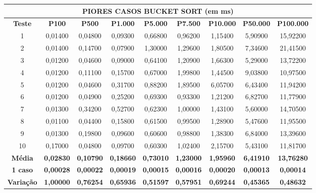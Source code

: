 \documentclass[a4paper, 12pt]{article}
\begin{document}
\begin{tabular}{ccccccccc}

                                                      \multicolumn{ 9}{c}{{\bf PIORES CASOS  BUCKET SORT (em ms)}} \\
\hline
{\bf Teste} & {\bf P100} & {\bf P500} & {\bf P1.000} & {\bf P5.000} & {\bf P7.500} & {\bf P10.000} & {\bf P50.000} & {\bf P100.000} \\
\hline
         1 &    0,01400 &    0,04800 &    0,09300 &    0,66800 &    0,96200 &    1,15400 &    5,90900 &   15,92200 \\
\hline
         2 &    0,01400 &    0,14700 &    0,07900 &    1,30000 &    1,29600 &    1,80500 &    7,34600 &   21,41500 \\
\hline
         3 &    0,01200 &    0,04600 &    0,09000 &    0,64100 &    1,20900 &    1,66300 &    5,29000 &   13,72200 \\
\hline
         4 &    0,01200 &    0,11100 &    0,15700 &    0,67000 &    1,99800 &    1,44500 &    9,03800 &   10,97500 \\
\hline
         5 &    0,01200 &    0,04600 &    0,31700 &    0,88200 &    1,89500 &    6,05700 &    6,43400 &   11,94200 \\
\hline
         6 &    0,01200 &    0,04900 &    0,25200 &    0,69300 &    0,93300 &    1,21200 &    6,82700 &   11,77900 \\
\hline
         7 &    0,01300 &    0,34200 &    0,52700 &    0,62300 &    1,00000 &    1,43100 &    5,60000 &   14,70500 \\
\hline
         8 &    0,01100 &    0,04400 &    0,15800 &    0,61500 &    0,99500 &    1,28900 &    5,47600 &   11,95500 \\
\hline
         9 &    0,01300 &    0,19800 &    0,09600 &    0,60600 &    0,98800 &    1,38300 &    6,84000 &   13,39600 \\
\hline
        10 &    0,17000 &    0,04800 &    0,09700 &    0,60300 &    1,02400 &    2,15700 &    5,43100 &   11,81700 \\
\hline
{\bf Média} & {\bf 0,02830} & {\bf 0,10790} & {\bf 0,18660} & {\bf 0,73010} & {\bf 1,23000} & {\bf 1,95960} & {\bf 6,41910} & {\bf 13,76280} \\
\hline
{\bf 1 caso} & {\bf 0,00028} & {\bf 0,00022} & {\bf 0,00019} & {\bf 0,00015} & {\bf 0,00016} & {\bf 0,00020} & {\bf 0,00013} & {\bf 0,00014} \\
\hline
{\bf Variação} & {\bf 1,00000} & {\bf 0,76254} & {\bf 0,65936} & {\bf 0,51597} & {\bf 0,57951} & {\bf 0,69244} & {\bf 0,45365} & {\bf 0,48632} \\
\hline
\end{tabular}  
\vspace{0.3cm}
\end{document}
